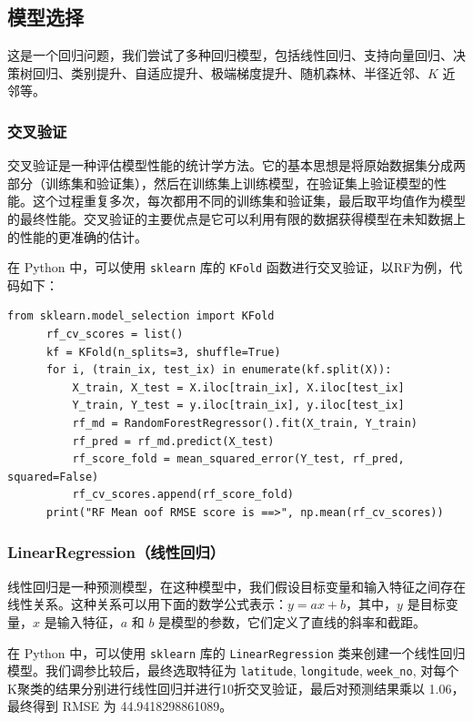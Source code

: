 \documentclass{ctexart}
\begin{document}
\subsection{模型选择}

这是一个回归问题，我们尝试了多种回归模型，包括线性回归、支持向量回归、决策树回归、类别提升、自适应提升、极端梯度提升、随机森林、半径近邻、$K$ 近邻等。

\subsubsection{交叉验证}

交叉验证是一种评估模型性能的统计学方法。它的基本思想是将原始数据集分成两部分（训练集和验证集），然后在训练集上训练模型，在验证集上验证模型的性能。这个过程重复多次，每次都用不同的训练集和验证集，最后取平均值作为模型的最终性能。交叉验证的主要优点是它可以利用有限的数据获得模型在未知数据上的性能的更准确的估计。

在 Python 中，可以使用 \texttt{sklearn} 库的 \texttt{KFold} 函数进行交叉验证，以RF为例，代码如下：

\begin{lstlisting}[style=Python]
      from sklearn.model_selection import KFold
      rf_cv_scores = list()
      kf = KFold(n_splits=3, shuffle=True)
      for i, (train_ix, test_ix) in enumerate(kf.split(X)):
          X_train, X_test = X.iloc[train_ix], X.iloc[test_ix]
          Y_train, Y_test = y.iloc[train_ix], y.iloc[test_ix]
          rf_md = RandomForestRegressor().fit(X_train, Y_train)
          rf_pred = rf_md.predict(X_test)
          rf_score_fold = mean_squared_error(Y_test, rf_pred, squared=False)
          rf_cv_scores.append(rf_score_fold)
      print("RF Mean oof RMSE score is ==>", np.mean(rf_cv_scores))
\end{lstlisting}

\subsubsection{LinearRegression（线性回归）}

线性回归是一种预测模型，在这种模型中，我们假设目标变量和输入特征之间存在线性关系。这种关系可以用下面的数学公式表示：$y = a x + b$，其中，$y$ 是目标变量，$x$ 是输入特征，$a$ 和 $b$ 是模型的参数，它们定义了直线的斜率和截距。

在 Python 中，可以使用 \texttt{sklearn} 库的 \texttt{LinearRegression} 类来创建一个线性回归模型。我们调参比较后，最终选取特征为 \texttt{latitude}, \texttt{longitude}, \texttt{week\_no}, 对每个K聚类的结果分别进行线性回归并进行10折交叉验证，最后对预测结果乘以 1.06，最终得到 RMSE 为 44.9418298861089。
\end{document}
